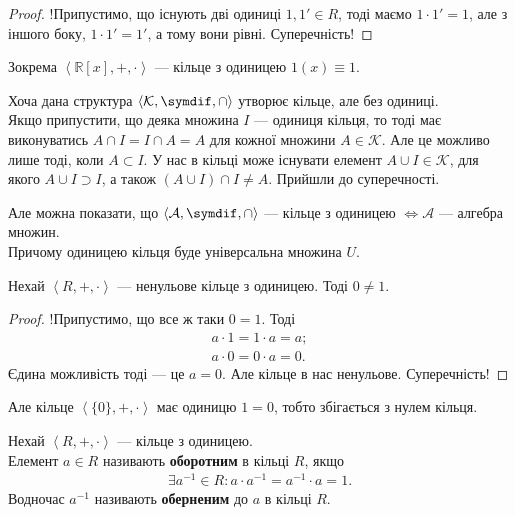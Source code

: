 \documentclass{math_library}
\begin{document}
\begin{proof}
!Припустимо, що існують дві одиниці $1, 1' \in R$, тоді маємо $1 \cdot 1' = 1$, але з іншого боку, $1 \cdot 1' = 1'$, а тому вони рівні. Суперечність!
\end{proof}

\begin{example}
Зокрема $\left<\mathbb{R}[x],+,\cdot \right>$ --- кільце з одиницею $1(x) \equiv 1$.
\end{example}

\begin{example}
Хоча дана структура $\left<\mathcal{K}, \symdif, \cap \right>$ утворює кільце, але без одиниці.
\bigskip \\
Якщо припустити, що деяка множина $I$ --- одиниця кільця, то тоді має виконуватись $A \cap I = I \cap A = A$ для кожної множини $A \in \mathcal{K}$. Але це можливо лише тоді, коли $A \subset I$. У нас в кільці може існувати елемент $A \cup I \in \mathcal{K}$, для якого $A \cup I \supset I$, а також $(A \cup I) \cap I \neq A$. Прийшли до суперечності.
\end{example}

\begin{example}
Але можна показати, що $\left<\mathcal{A}, \symdif, \cap \right>$ --- кільце з одиницею $\iff \mathcal{A}$ --- алгебра множин. \\
Причому одиницею кільця буде універсальна множина $U$.
\end{example}

\begin{lemma}
Нехай $\left<R,+,\cdot \right>$ --- ненульове кільце з одиницею. Тоді $0 \neq 1$.
\end{lemma}

\begin{proof}
!Припустимо, що все ж таки $0 = 1$. Тоді
\begin{align*}
a \cdot 1 = 1 \cdot a = a; \\
a \cdot 0 = 0 \cdot a = 0.
\end{align*}
Єдина можливість тоді --- це $a = 0$. Але кільце в нас ненульове. Суперечність!
\end{proof}

\begin{remark}
Але кільце $\left< \{0\},+,\cdot \right>$ має одиницю $1 = 0$, тобто збігається з нулем кільця.
\end{remark}

\begin{definition}
Нехай $\left<R,+,\cdot \right>$ --- кільце з одиницею.\\
Елемент $a \in R$ називають \textbf{оборотним} в кільці $R$, якщо
\begin{align*}
\exists a^{-1} \in R: a \cdot a^{-1} = a^{-1} \cdot a = 1.
\end{align*}
Водночас $a^{-1}$ називають \textbf{оберненим} до $a$ в кільці $R$.
\end{definition}
\end{document}
